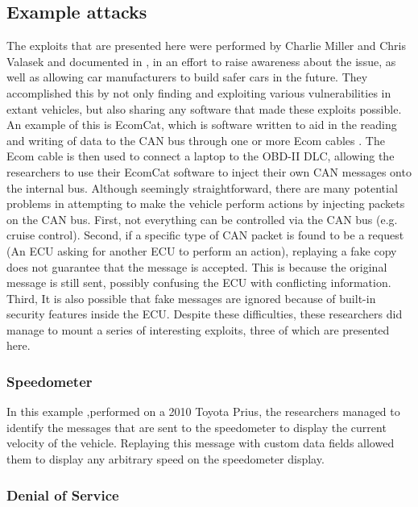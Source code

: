 \subsection{Example attacks}
\label{subsec:example_attacks}

The exploits that are presented here were performed by Charlie Miller and Chris Valasek and documented in , in an effort to raise awareness about the issue, as well as allowing car manufacturers to build safer cars in the future. They accomplished this by not only finding and exploiting various vulnerabilities in extant vehicles, but also sharing any software that made these exploits possible. An example of this is EcomCat, which is software written to aid in the reading and writing of data to the CAN bus through one or more Ecom cables \cite{MillerC}. The Ecom cable is then used to connect a laptop to the OBD-II DLC, allowing the researchers to use their EcomCat software to inject their own CAN messages onto the internal bus. Although seemingly straightforward, there are many potential problems in attempting to make the vehicle perform actions by injecting packets on the CAN bus. First, not everything can be controlled via the CAN bus (e.g. cruise control). Second, if a specific type of CAN packet is found to be a request (An ECU asking for another ECU to perform an action), replaying a fake copy does not guarantee that the message is accepted. This is because the original message is still sent, possibly confusing the ECU with conflicting information. Third, It is also possible that fake messages are ignored because of built-in security features inside the ECU. Despite these difficulties, these researchers did manage to mount a series of interesting exploits, three of which are presented here.

\subsubsection{Speedometer} 
\label{subsubsec:speedometer}

In this example ,performed on a 2010 Toyota Prius, the researchers managed to identify the messages that are sent to the speedometer to display the current velocity of the vehicle. Replaying this message with custom data fields allowed them to display any arbitrary speed on the speedometer display.

\subsubsection{Denial of Service} 
\label{subsubsec:denial_of_service}

